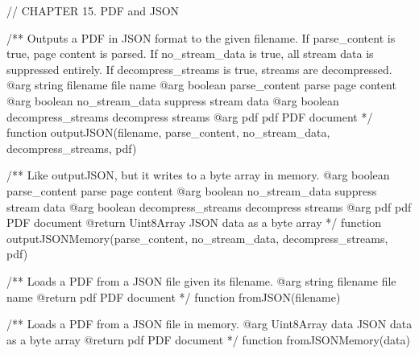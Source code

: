 // CHAPTER 15. PDF and JSON

/** Outputs a PDF in JSON format to the given filename. If parse_content is
true, page content is parsed. If no_stream_data is true, all stream data is
suppressed entirely. If decompress_streams is true, streams are decompressed.
@arg {string} filename file name
@arg {boolean} parse_content parse page content
@arg {boolean} no_stream_data suppress stream data
@arg {boolean} decompress_streams decompress streams
@arg {pdf} pdf PDF document */
function outputJSON(filename, parse_content, no_stream_data, decompress_streams, pdf) {}

/** Like outputJSON, but it writes to a byte array in memory.
@arg {boolean} parse_content parse page content
@arg {boolean} no_stream_data suppress stream data
@arg {boolean} decompress_streams decompress streams
@arg {pdf} pdf PDF document
@return {Uint8Array} JSON data as a byte array */
function outputJSONMemory(parse_content, no_stream_data, decompress_streams, pdf) {}

/** Loads a PDF from a JSON file given its filename.
@arg {string} filename file name
@return {pdf} PDF document */
function fromJSON(filename) {}

/** Loads a PDF from a JSON file in memory. 
@arg {Uint8Array} data JSON data as a byte array
@return {pdf} PDF document */
function fromJSONMemory(data) {}

